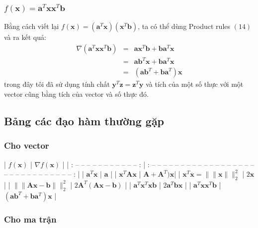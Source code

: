 \subsubsection{$f(\mathbf{x}) = \mathbf{a}^T\mathbf{x}\mathbf{x}^T\mathbf{b}$}
Bằng cách viết lại $f(\mathbf{x}) = (\mathbf{a}^T\mathbf{x})(\mathbf{x}^T\mathbf{b})$, ta có thể dùng Product rules $(14)$ và ra kết quả:  
\begin{eqnarray} 
\nabla (\mathbf{a}^T\mathbf{x}\mathbf{x}^T\mathbf{b}) &=& \mathbf{a} \mathbf{x}^T\mathbf{b} +  \mathbf{b}\mathbf{a}^T\mathbf{x} \\\ 
&=& \mathbf{ab}^T\mathbf{x} + \mathbf{b}\mathbf{a}^T\mathbf{x}\\\ 
&=& (\mathbf{ab}^T + \mathbf{ba}^T)\mathbf{x} 
\end{eqnarray} 
trong đây tôi đã sử dụng tính chất $\mathbf{y}^T\mathbf{z} = \mathbf{z}^T\mathbf{y}$ và tích của một số thực với một vector cũng bằng tích của vector và số thực đó.  
 
 
\subsection{Bảng các đạo hàm thường gặp}
 
\subsubsection{Cho vector }
 
| $f(\mathbf{x}) $           | $ \nabla f(\mathbf{x}) $     |          
| : --  --  --  --  --  --  --  --  --  --  -- :       | : --  --  --  --  --  --  --  --  --  --  --  --  --  --  --  --  --  --  --  --  --  --  --  --  --  --  --  --  --  -- : |          
| $\mathbf{a}^T \mathbf{x} $ | $\mathbf{a}$                                               |   
| $\mathbf{x}^T\mathbf{Ax}$  | $\mathbf{A} + \mathbf{A}^T) \mathbf{x}$|        
| $\mathbf{x}^T \mathbf{x} =  \| \|\mathbf{x} \|\|_2^2 $  | $2\mathbf{x}  $     | 
| $ \|\|\mathbf{Ax-b} \|\|_2^2 $  | $ 2\mathbf{A}^T (\mathbf{Ax - b})$      |          
| $\mathbf{a}^T\mathbf{x}^T\mathbf{xb} $ |  $2\mathbf{a}^T\mathbf{bx} $ | 
| $\mathbf{a}^T\mathbf{x}\mathbf{x}^T\mathbf{b} $ |  $ (\mathbf{a}\mathbf{b}^T + \mathbf{b}\mathbf{a}^T) \mathbf{x} $ | 
 
 
\subsubsection{Cho ma trận}
 
